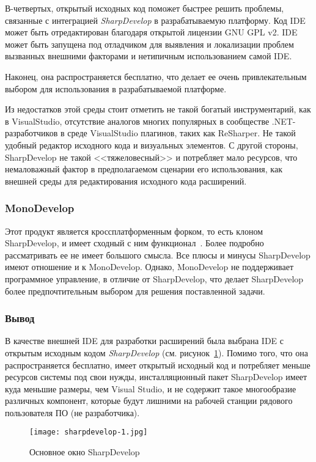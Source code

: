 В-четвертых, открытый исходных код поможет быстрее решить проблемы, связанные с интеграцией {\it SharpDevelop} в разрабатываемую платформу. Код IDE может быть отредактирован благодаря открытой лицензии GNU GPL v2. IDE может быть запущена под отладчиком для выявления и локализации проблем вызванных внешними факторами и нетипичным использованием самой IDE.

Наконец, она распространяется бесплатно, что делает ее очень привлекательным выбором для использования в разрабатываемой платформе.

Из недостатков этой среды стоит отметить не такой богатый инструментарий, как в VisualStudio, отсутствие аналогов многих популярных в сообществе .NET-разработчиков в среде  VisualStudio плагинов, таких как ReSharper. Не такой удобный редактор исходного кода и визуальных элементов. С другой стороны, SharpDevelop не такой <<тяжеловесный>> и потребляет мало ресурсов, что немаловажный фактор в предполагаемом сценарии его использования, как внешней среды для редактирования исходного кода расширений.

\subsubsection{MonoDevelop}

Этот продукт является кроссплатформенным форком, то есть клоном SharpDevelop, и имеет сходный с ним функционал~\cite{monodevelop-website}. Более подробно рассматривать ее не имеет большого смысла. Все плюсы и минусы SharpDevelop имеют отношение и к MonoDevelop. Однако, MonoDevelop не поддерживает программное управление, в отличие от SharpDevelop, что делает SharpDevelop более предпочтительным выбором для решения поставленной задачи.

\subsubsection{Вывод}

В качестве внешней IDE для разработки расширений была выбрана IDE с открытым исходным кодом {\it SharpDevelop} (см. рисунок~\ref{pic:sharpdevelop-main-wnd}). Помимо того, что она распространяется бесплатно, имеет открытый исходный код и потребляет меньше ресурсов системы под свои нужды, инсталляционный пакет SharpDevelop имеет куда меньшие размеры, чем Visual Studio, и не содержит такое многообразие различных компонент, которые будут лишними на рабочей станции рядового пользователя ПО (не разработчика).

\begin{figure}[!h]
    \centering
    \texttt{[image: sharpdevelop-1.jpg]}
    \caption{Основное окно SharpDevelop}
    \label{pic:sharpdevelop-main-wnd}
\end{figure} 

\pagebreak
